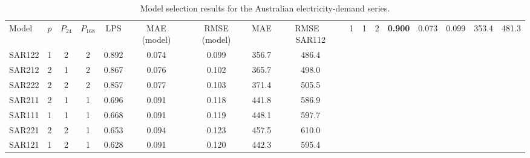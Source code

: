\begin{table}[htbp]
\centering
\caption{Model selection results for the Australian electricity-demand series.}
\label{tab:aus_model_selection}
\begin{tabular}{lcccccccc}
\toprule
Model & $p$ & $P_{24}$ & $P_{168}$ & LPS & MAE (model) & RMSE (model) & MAE & RMSE \
\midrule
SAR112 & 1 & 1 & 2 & \textbf{0.900} & 0.073 & 0.099 & 353.4 & 481.3 \\
SAR122 & 1 & 2 & 2 & 0.892 & 0.074 & 0.099 & 356.7 & 486.4 \\
SAR212 & 2 & 1 & 2 & 0.867 & 0.076 & 0.102 & 365.7 & 498.0 \\
SAR222 & 2 & 2 & 2 & 0.857 & 0.077 & 0.103 & 371.4 & 505.5 \\
SAR211 & 2 & 1 & 1 & 0.696 & 0.091 & 0.118 & 441.8 & 586.9 \\
SAR111 & 1 & 1 & 1 & 0.668 & 0.091 & 0.119 & 448.1 & 597.7 \\
SAR221 & 2 & 2 & 1 & 0.653 & 0.094 & 0.123 & 457.5 & 610.0 \\
SAR121 & 1 & 2 & 1 & 0.628 & 0.091 & 0.120 & 442.3 & 595.4 \\
\bottomrule
\end{tabular}
\end{table}
